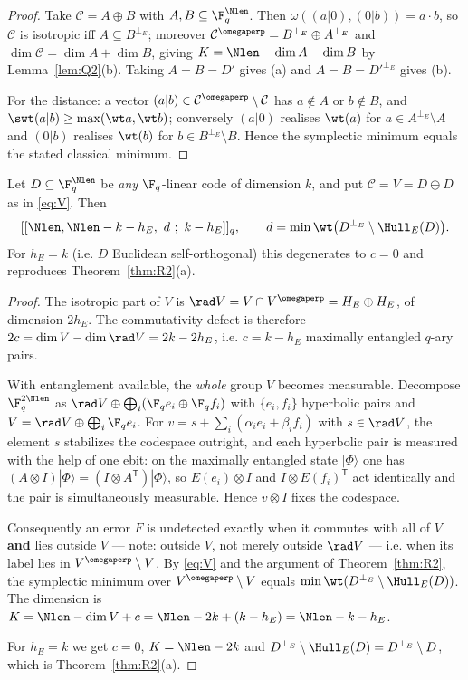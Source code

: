 \begin{proof}
Take $\mathcal C=A\oplus B$ with $A,B\subseteq\F_q^{\Nlen}$. Then
$\omega((a|0),(0|b))=a\cdot b$, so $\mathcal C$ is isotropic iff
$A\subseteq B^{\perp_E}$; moreover $\mathcal C^{\omegaperp}
=B^{\perp_E}\oplus A^{\perp_E}$ and $\dim\mathcal C=\dim A+\dim B$, giving
$K=\Nlen-\dim A-\dim B$ by Lemma~\ref{lem:Q2}(b). Taking $A=B=D'$ gives (a) and
$A=B=D'^{\perp_E}$ gives (b).

For the distance: a vector $(a|b)\in\mathcal C^{\omegaperp}\setminus\mathcal C$
has $a\notin A$ or $b\notin B$, and
$\swt(a|b)\ge\max(\wt a,\wt b)$; conversely $(a|0)$ realises $\wt(a)$ for
$a\in A^{\perp_E}\setminus A$ and $(0|b)$ realises $\wt(b)$ for
$b\in B^{\perp_E}\setminus B$. Hence the symplectic minimum equals the stated
classical minimum.
\end{proof}

\begin{theorem}\label{thm:R3}
Let $D\subseteq\F_q^{\Nlen}$ be \emph{any} $\F_q$-linear code of dimension $k$,
and put $\mathcal C=V=D\oplus D$ as in \eqref{eq:V}. Then
\[
  [[\Nlen,\Nlen-k-h_E,\ d\ ;\ k-h_E]]_q,\qquad
  d=\min\wt\bigl(D^{\perp_E}\setminus\Hull_E(D)\bigr).
\]
For $h_E=k$ (i.e. $D$ Euclidean self-orthogonal) this degenerates to $c=0$ and
reproduces Theorem~\ref{thm:R2}(a).
\end{theorem}

\begin{proof}
The isotropic part of $V$ is
$\rad V=V\cap V^{\omegaperp}=H_E\oplus H_E$, of dimension $2h_E$. The
commutativity defect is therefore
$2c=\dim V-\dim\rad V=2k-2h_E$, i.e. $c=k-h_E$ maximally entangled $q$-ary
pairs.

With entanglement available, the \emph{whole} group $V$ becomes measurable.
Decompose $\F_q^{2\Nlen}$ as $\rad V\oplus\bigoplus_i(\F_qe_i\oplus\F_qf_i)$
with $\{e_i,f_i\}$ hyperbolic pairs and $V=\rad V\oplus\bigoplus_i\F_qe_i$.
For $v=s+\sum_i(\alpha_ie_i+\beta_if_i)$ with $s\in\rad V$, the element $s$
stabilizes the codespace outright, and each hyperbolic pair is measured with the
help of one ebit: on the maximally entangled state $|\Phi\rangle$ one has
$(A\otimes I)|\Phi\rangle=(I\otimes A^{\mathsf T})|\Phi\rangle$, so
$E(e_i)\otimes I$ and $I\otimes E(f_i)^{\mathsf T}$ act identically and the
pair is simultaneously measurable. Hence $v\otimes I$ fixes the codespace.

Consequently an error $F$ is undetected exactly when it commutes with all of $V$
\textbf{and} lies outside $V$ --- note: outside $V$, not merely outside
$\rad V$ --- i.e. when its label lies in $V^{\omegaperp}\setminus V$. By
\eqref{eq:V} and the argument of Theorem~\ref{thm:R2}, the symplectic minimum
over $V^{\omegaperp}\setminus V$ equals
$\min\wt(D^{\perp_E}\setminus\Hull_E(D))$. The dimension is
$K=\Nlen-\dim V+c=\Nlen-2k+(k-h_E)=\Nlen-k-h_E$.

For $h_E=k$ we get $c=0$, $K=\Nlen-2k$ and
$D^{\perp_E}\setminus\Hull_E(D)=D^{\perp_E}\setminus D$, which is
Theorem~\ref{thm:R2}(a).
\end{proof}

